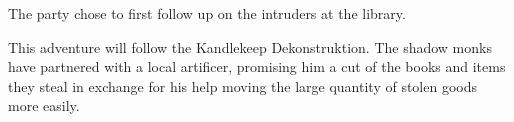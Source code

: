 The party chose to first follow up on the intruders at the library.

This adventure will follow the Kandlekeep Dekonstruktion.
The shadow monks have partnered with a local artificer, promising him a cut of the books and items they steal in exchange for his help moving the large quantity of stolen goods more easily.